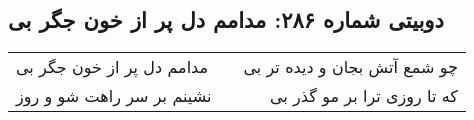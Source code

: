 \begin{center}
\section*{دوبیتی شماره ۲۸۶: مدامم دل پر از خون جگر بی}
\label{sec:286}
\begin{longtable}{l p{0.5cm} r}
مدامم دل پر از خون جگر بی
&&
چو شمع آتش بجان و دیده تر بی
\\
نشینم بر سر راهت شو و روز
&&
که تا روزی ترا بر مو گذر بی
\\
\end{longtable}
\end{center}
